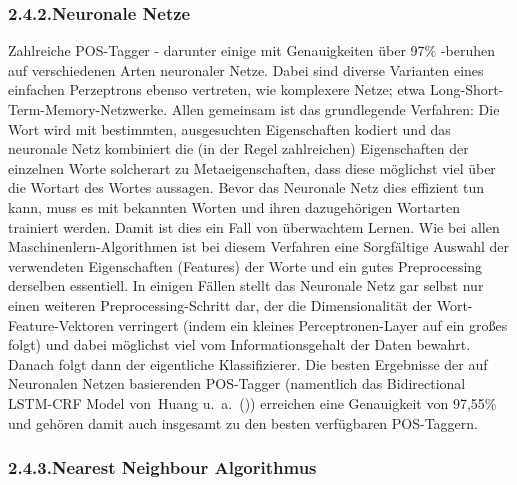 \documentclass{article}
\begin{document}
\subsubsection{2.4.2.\hspace*{0.5em}Neuronale Netze}\label{sec-neuronale-netze}%

\noindent{}Zahlreiche POS-Tagger - darunter einige mit Genauigkeiten über 97\% -beruhen auf verschiedenen Arten neuronaler Netze. Dabei sind diverse Varianten eines einfachen Perzeptrons ebenso vertreten, wie komplexere Netze; etwa Long-Short-Term-Memory-Netzwerke.
Allen gemeinsam ist das grundlegende Verfahren: Die Wort wird mit bestimmten, ausgesuchten Eigenschaften kodiert und das neuronale Netz kombiniert die (in der Regel zahlreichen) Eigenschaften der einzelnen Worte solcherart zu Metaeigenschaften, dass diese möglichst viel über die Wortart des Wortes aussagen. Bevor das Neuronale Netz dies effizient tun kann, muss es mit bekannten Worten und ihren dazugehörigen Wortarten trainiert werden. Damit ist dies ein Fall von überwachtem Lernen.
Wie bei allen Maschinenlern-Algorithmen ist bei diesem Verfahren eine Sorgfältige Auswahl der verwendeten Eigenschaften (Features) der Worte und ein gutes Preprocessing derselben essentiell. In einigen Fällen stellt das Neuronale Netz gar selbst nur einen weiteren Preprocessing-Schritt dar, der die Dimensionalität der Wort-Feature-Vektoren verringert (indem ein kleines Perceptronen-Layer auf ein großes folgt) und dabei möglichst viel vom Informationsgehalt der Daten bewahrt. Danach folgt dann der eigentliche Klassifizierer.
Die besten Ergebnisse der auf Neuronalen Netzen basierenden POS-Tagger (namentlich das Bidirectional LSTM-CRF Model von~Huang u. a.~()) erreichen eine Genauigkeit von 97,55\% und gehören damit auch insgesamt zu den besten verfügbaren POS-Taggern.%

\subsubsection{2.4.3.\hspace*{0.5em}Nearest Neighbour Algorithmus}\label{sec-nearest-neighbour-algorithmus}%
\end{document}
